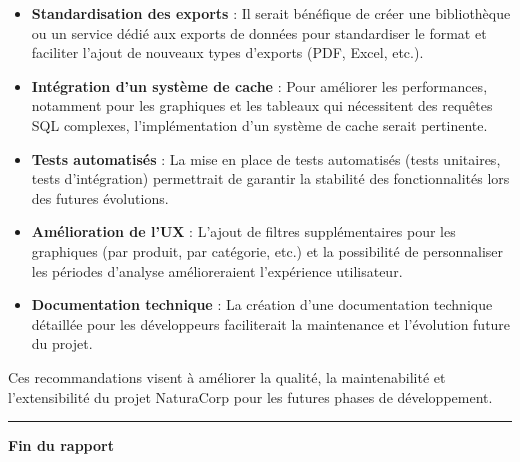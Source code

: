 \documentclass[a4paper,12pt]{report}
\begin{document}
  \begin{itemize}
    \item \textbf{Standardisation des exports} : Il serait bénéfique de créer une bibliothèque ou un service dédié aux exports de données pour standardiser le format et faciliter l'ajout de nouveaux types d'exports (PDF, Excel, etc.).
    
    \item \textbf{Intégration d'un système de cache} : Pour améliorer les performances, notamment pour les graphiques et les tableaux qui nécessitent des requêtes SQL complexes, l'implémentation d'un système de cache serait pertinente.
    
    \item \textbf{Tests automatisés} : La mise en place de tests automatisés (tests unitaires, tests d'intégration) permettrait de garantir la stabilité des fonctionnalités lors des futures évolutions.
    
    \item \textbf{Amélioration de l'UX} : L'ajout de filtres supplémentaires pour les graphiques (par produit, par catégorie, etc.) et la possibilité de personnaliser les périodes d'analyse amélioreraient l'expérience utilisateur.
    
    \item \textbf{Documentation technique} : La création d'une documentation technique détaillée pour les développeurs faciliterait la maintenance et l'évolution future du projet.
  \end{itemize}
  
  Ces recommandations visent à améliorer la qualité, la maintenabilité et l'extensibilité du projet NaturaCorp pour les futures phases de développement.
  
  \vspace{1cm}
  \begin{center}
    \rule{0.5\textwidth}{0.5pt}
    \vspace{0.3cm}
    \textbf{Fin du rapport}
  \end{center}
\end{document}
